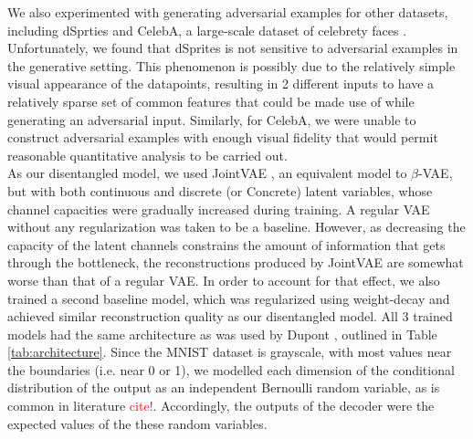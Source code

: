 \documentclass{report}
\newcommand\todo[1]{\textcolor{red}{#1}}
\begin{document}
\noindent We also experimented with generating adversarial examples for other datasets, including dSprties and CelebA, a large-scale dataset of celebrety faces \cite{celeba}. Unfortunately, we found that dSprites is not sensitive to adversarial examples in the generative setting. This phenomenon is possibly due to the relatively simple visual appearance of the datapoints, resulting in 2 different inputs to have a relatively sparse set of common features that could be made use of while generating an adversarial input. Similarly, for CelebA, we were unable to construct adversarial examples with enough visual fidelity that would permit reasonable quantitative analysis to be carried out. \\

\noindent As our disentangled model, we used JointVAE \cite{joint-vae}, an equivalent model to $\beta$-VAE, but with both continuous and discrete (or Concrete) latent variables, whose channel capacities were gradually increased during training. A regular VAE without any regularization was taken to be a baseline. However, as decreasing the capacity of the latent channels constrains the amount of information that gets through the bottleneck, the reconstructions produced by JointVAE are somewhat worse than that of a regular VAE. In order to account for that effect, we also trained a second baseline model, which was regularized using weight-decay and achieved similar reconstruction quality as our disentangled model. All 3 trained models had the same architecture as was used by Dupont \cite{joint-vae}, outlined in Table \ref{tab:architecture}. Since the MNIST dataset is grayscale, with most values near the boundaries (i.e. near 0 or 1), we modelled each dimension of the conditional distribution of the output as an independent Bernoulli random variable, as is common in literature \todo{cite!}. Accordingly, the outputs of the decoder were the expected values of the these random variables. \\
\end{document}
